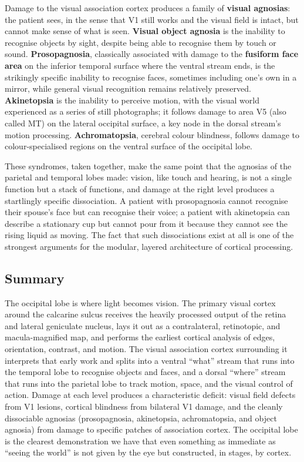 \documentclass[11pt]{article}
\begin{document}
Damage to the visual association cortex produces a family of \textbf{visual agnosias}: the patient sees, in the sense that V1 still works and the visual field is intact, but cannot make sense of what is seen. \textbf{Visual object agnosia} is the inability to recognise objects by sight, despite being able to recognise them by touch or sound. \textbf{Prosopagnosia}, classically associated with damage to the \textbf{fusiform face area} on the inferior temporal surface where the ventral stream ends, is the strikingly specific inability to recognise faces, sometimes including one's own in a mirror, while general visual recognition remains relatively preserved. \textbf{Akinetopsia} is the inability to perceive motion, with the visual world experienced as a series of still photographs; it follows damage to area V5 (also called MT) on the lateral occipital surface, a key node in the dorsal stream's motion processing. \textbf{Achromatopsia}, cerebral colour blindness, follows damage to colour-specialised regions on the ventral surface of the occipital lobe.

These syndromes, taken together, make the same point that the agnosias of the parietal and temporal lobes made: vision, like touch and hearing, is not a single function but a stack of functions, and damage at the right level produces a startlingly specific dissociation. A patient with prosopagnosia cannot recognise their spouse's face but can recognise their voice; a patient with akinetopsia can describe a stationary cup but cannot pour from it because they cannot see the rising liquid as moving. The fact that such dissociations exist at all is one of the strongest arguments for the modular, layered architecture of cortical processing.

\subsection{Summary}

The occipital lobe is where light becomes vision. The primary visual cortex around the calcarine sulcus receives the heavily processed output of the retina and lateral geniculate nucleus, lays it out as a contralateral, retinotopic, and macula-magnified map, and performs the earliest cortical analysis of edges, orientation, contrast, and motion. The visual association cortex surrounding it interprets that early work and splits into a ventral ``what'' stream that runs into the temporal lobe to recognise objects and faces, and a dorsal ``where'' stream that runs into the parietal lobe to track motion, space, and the visual control of action. Damage at each level produces a characteristic deficit: visual field defects from V1 lesions, cortical blindness from bilateral V1 damage, and the cleanly dissociable agnosias (prosopagnosia, akinetopsia, achromatopsia, and object agnosia) from damage to specific patches of association cortex. The occipital lobe is the clearest demonstration we have that even something as immediate as ``seeing the world'' is not given by the eye but constructed, in stages, by cortex.
\end{document}
